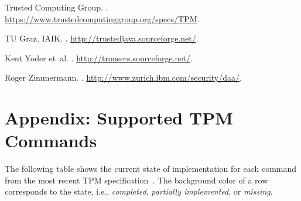 \documentclass[runningheads]{llncs}
\begin{document}
\begin{thebibliography}{10}
{Trusted Computing Group}.
.
\newblock \newline\url{https://www.trustedcomputinggroup.org/specs/TPM}.

{TU Graz, IAIK}.
.
\newblock \newline\url{http://trustedjava.sourceforge.net/}.

Kent Yoder et~al.
.
\newblock \newline\url{http://trousers.sourceforge.net/}.

Roger Zimmermann.
.
\newblock
  \newline\url{http://www.zurich.ibm.com/security/daa/}.

\end{thebibliography}

\appendix
\newpage

\section{Appendix: Supported TPM Commands}\label{app:commands}
\newcommand{\tpmred}{tpmgray!10!red!50!white}
\newcommand{\tpmyellow}{tpmgray!10!yellow!50!white}
\newcommand{\tpmgreen}{tpmgray!10!green!50!white}
\newcommand{\tpmcolor}{tpmgray}

\newcommand{\tpmcmd}[6]{
	\begin{tabular}{p{4.5cm}|p{0.46cm}|p{0.4cm}|p{0.25cm}|p{2.5cm}|p{2.5cm}}
		\rowcolor{\tpmcolor}
			{\scriptsize\textsf{#1}} &
			{\scriptsize\textsf{#2}} &
			{\scriptsize\makebox[0.4cm][r]{#3}} &
			{\scriptsize\makebox[0.25cm][c]{#4}} &
			{\scriptsize\texttt{#5}} &
			{\scriptsize #6}\\
	\end{tabular}
}
\newcommand{\tpmcmdr}[6]{
	\renewcommand{\tpmcolor}{\tpmred}
	\tpmcmd{#1}{#2}{#3}{#4}{#5}{#6}
	\renewcommand{\tpmcolor}{tpmgray}
}
\newcommand{\tpmcmdg}[6]{
	\renewcommand{\tpmcolor}{\tpmgreen}
	\tpmcmd{#1}{#2}{#3}{#4}{#5}{#6}
	\renewcommand{\tpmcolor}{tpmgray}
}
\newcommand{\tpmcmdy}[6]{
	\renewcommand{\tpmcolor}{\tpmyellow}
	\tpmcmd{#1}{#2}{#3}{#4}{#5}{#6}
	\renewcommand{\tpmcolor}{tpmgray}
}
The following table shows the current state of implementation for each
command from the most recent TPM specification~\cite{TPM}. The background
color of a row corresponds to the state, i.e.,
\colorbox{\tpmgreen}{\emph{completed}},
\colorbox{\tpmyellow}{\emph{partially implemented}}, or
\colorbox{\tpmred}{\emph{missing}}.
\end{document}
